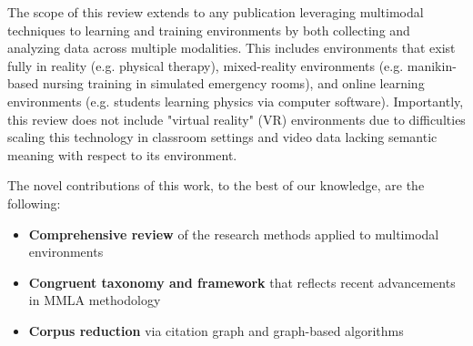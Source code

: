\documentclass[manuscript,screen,review]{acmart}
\begin{document}
The scope of this review extends to any publication leveraging multimodal techniques to learning and training environments by both collecting and analyzing data across multiple modalities. This includes environments that exist fully in reality (e.g. physical therapy), mixed-reality environments (e.g. manikin-based nursing training in simulated emergency rooms), and online learning environments (e.g. students learning physics via computer software). Importantly, this review does not include "virtual reality" (VR) environments due to difficulties scaling this technology in classroom settings \cite{} and video data lacking semantic meaning with respect to its environment.

The novel contributions of this work, to the best of our knowledge, are the following: 
\begin{itemize}
    \item \textbf{Comprehensive review} of the research methods applied to multimodal environments
    \item \textbf{Congruent taxonomy and framework} that reflects recent advancements in MMLA methodology
    \item \textbf{Corpus reduction} via citation graph and graph-based algorithms

\end{itemize}
\end{document}
